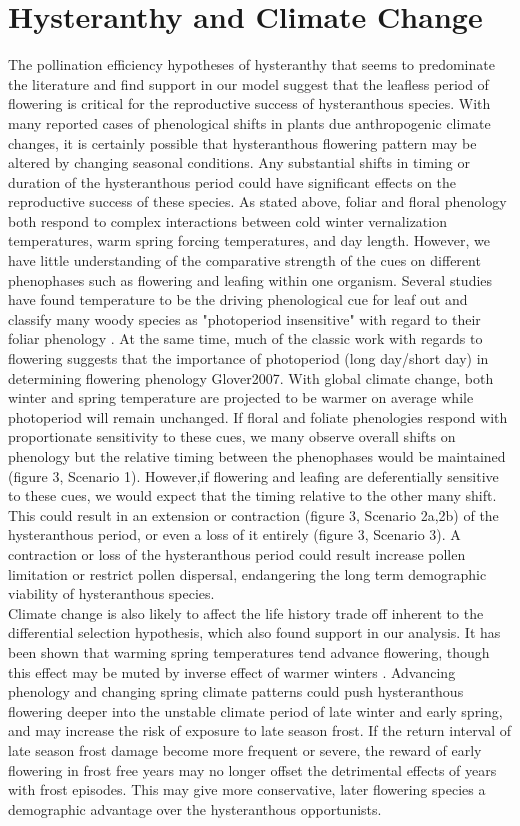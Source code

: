 \documentclass{article}
\begin{document}
\section*{Hysteranthy and Climate Change}
\indent The pollination efficiency hypotheses of hysteranthy that seems to predominate the literature and find support in our model suggest that the leafless period of flowering is critical for the reproductive success of hysteranthous species. With many reported cases of phenological shifts in plants due anthropogenic climate changes, it is certainly possible that hysteranthous flowering pattern may be altered by changing seasonal conditions. Any substantial shifts in timing or duration of the hysteranthous period could have significant effects on the reproductive success of these species. As stated above, foliar and floral phenology both respond to complex interactions between cold winter vernalization temperatures, warm spring forcing temperatures, and day length. However, we have little understanding of the comparative strength of the cues on different phenophases such as flowering and leafing within one organism. Several studies have found temperature to be the driving phenological cue for leaf out and classify many woody species as "photoperiod insensitive" with regard to their foliar phenology \citep{Basler2012}. At the same time, much of the classic work with regards to flowering suggests that the importance of photoperiod (long day/short day) in determining flowering phenology {Glover2007}. With global climate change, both winter and spring temperature are projected to be warmer on average while photoperiod will remain unchanged. If floral and foliate phenologies respond with proportionate sensitivity to these cues, we many observe overall shifts on phenology but the relative timing between the phenophases would be maintained (figure 3, Scenario 1). However,if flowering and leafing are deferentially sensitive to these cues, we would expect that the timing relative to the other many shift. This could result in an extension or contraction (figure 3, Scenario 2a,2b) of the hysteranthous period, or even a loss of it entirely (figure 3, Scenario 3). A contraction or loss of the hysteranthous period could result increase pollen limitation or restrict pollen dispersal, endangering the long term  demographic viability of hysteranthous species.\\
\indent Climate change is also likely to affect the life history trade off inherent to the differential selection hypothesis, which also found support in our analysis. It has been shown that warming spring temperatures tend advance flowering, though this effect may be muted by inverse effect of warmer winters \citep{Cook2012}. Advancing phenology and changing spring climate patterns could push hysteranthous flowering deeper into the unstable climate period of late winter and early spring, and may increase the risk of exposure to late season frost. If the return interval of late season frost damage become more frequent or severe, the reward of early flowering in frost free years may no longer offset the detrimental effects of years with frost episodes. This may give more conservative, later flowering species a demographic advantage over the hysteranthous opportunists.\\
\end{document}
